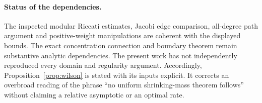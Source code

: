 \paragraph{Status of the dependencies.}
The inspected modular Riccati estimates, Jacobi edge comparison, all-degree path argument and positive-weight manipulations are coherent with the displayed bounds. The exact concentration connection and boundary theorem remain substantive analytic dependencies. The present work has not independently reproduced every domain and regularity argument. Accordingly, Proposition~\ref{prop:wilson} is stated with its inputs explicit. It corrects an overbroad reading of the phrase “no uniform shrinking-mass theorem follows” without claiming a relative asymptotic or an optimal rate.
